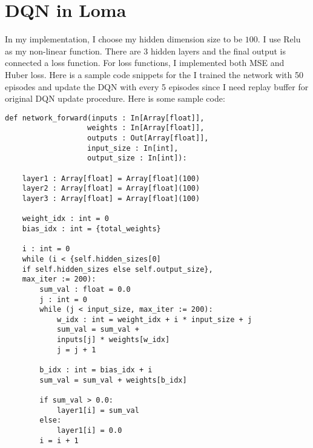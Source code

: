 \documentclass{article}
\begin{document}
\section{DQN in Loma}
In my implementation, I choose my hidden dimension size to be $100$. I use Relu as my non-linear function. There are $3$ hidden layers and the final output is connected
a loss function. For loss functions, I implemented both MSE and Huber loss. Here is a sample code snippets for the  I trained the network with 50 episodes and update the DQN with every 5 episodes since I need
replay buffer for original DQN update procedure. Here is some sample code:
\begin{lstlisting}
def network_forward(inputs : In[Array[float]], 
                   weights : In[Array[float]], 
                   outputs : Out[Array[float]], 
                   input_size : In[int],
                   output_size : In[int]):
    
    layer1 : Array[float] = Array[float](100)
    layer2 : Array[float] = Array[float](100)
    layer3 : Array[float] = Array[float](100)
    
    weight_idx : int = 0
    bias_idx : int = {total_weights}
    
    i : int = 0
    while (i < {self.hidden_sizes[0] 
    if self.hidden_sizes else self.output_size}, 
    max_iter := 200):
        sum_val : float = 0.0
        j : int = 0
        while (j < input_size, max_iter := 200):
            w_idx : int = weight_idx + i * input_size + j
            sum_val = sum_val + 
            inputs[j] * weights[w_idx]
            j = j + 1
        
        b_idx : int = bias_idx + i
        sum_val = sum_val + weights[b_idx]
        
        if sum_val > 0.0:
            layer1[i] = sum_val
        else:
            layer1[i] = 0.0
        i = i + 1
\end{lstlisting}
\end{document}
